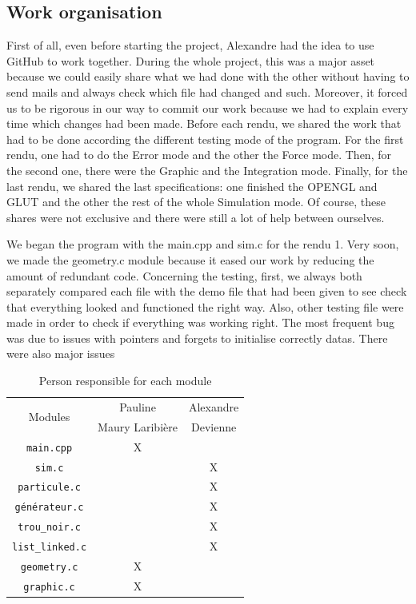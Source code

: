 \documentclass[a4paper]{article} %
\begin{document}
\begin{multicols*}{2}
\subsection{Work organisation}
First of all, even before starting the project,
Alexandre had the idea to use GitHub to work together.
During the whole project, this was a major asset because we could easily share
what we had done with the other without having to send mails
and always check which file had changed and such.
Moreover, it forced us to be rigorous in our way to commit our work
because we had to explain every time which changes had been made.
Before each rendu, we shared the work that had to be done
according the different testing mode of the program.
For the first rendu, one had to do the Error mode and the other the Force mode.
Then, for the second one, there were the Graphic and the Integration mode.
Finally, for the last rendu, we shared the last specifications:
one finished the OPENGL and GLUT
and the other the rest of the whole Simulation mode.
Of course, these shares were not exclusive
and there were still a lot of help between ourselves.

We began the program with the main.cpp and sim.c for the rendu 1.
Very soon, we made the geometry.c module because it eased our work
by reducing the amount of redundant code.
Concerning the testing, first, we always both separately compared each file
with the demo file that had been given to see check that everything looked
and functioned the right way.
Also, other testing file were made in order to check if everything was working right.
The most frequent bug was due to issues with pointers and forgets to initialise correctly datas.
There were also major issues 

\begin{table}[H]
\begin{center}
\begin{tabular}{|c|c|c|}
\hline
\multicolumn{1}{|c|}{\multirow{2}{*}{Modules}} & Pauline & Alexandre \\
 & Maury Laribière &  Devienne\\
\hline
\hline
\texttt{main.cpp} &  X &\\
\hline
\texttt{sim.c} & &X\\
\hline
\texttt{particule.c} & & X\\
\hline
\texttt{générateur.c} & & X\\
\hline
\texttt{trou\_noir.c} & & X\\
\hline
\texttt{list\_linked.c} & &X\\
\hline
\texttt{geometry.c} & X&\\
\hline
\texttt{graphic.c} & X&\\
\hline
\end{tabular}
\end{center}
\caption{Person responsible for each module}
\end{table}


\end{multicols*}
\end{document}
